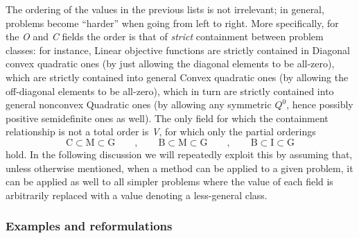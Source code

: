 The ordering of the values in the previous lists is not irrelevant; in general, problems become ``harder'' when going from left to right. More specifically, for the \textit{O} and \textit{C} fields the order is that of \emph{strict} containment between problem classes: for instance, Linear objective functions are strictly contained in Diagonal convex quadratic ones (by just allowing the diagonal elements to be all-zero), which are strictly contained into general Convex quadratic ones (by allowing the off-diagonal elements to be all-zero), which in turn are strictly contained into general nonconvex Quadratic ones (by allowing any symmetric $Q^0$, hence possibly positive semidefinite ones as well). The only field for which the containment relationship is not a total order is \textit{V}, for which only the partial orderings
\[
 \mbox{C} \subset \mbox{M} \subset \mbox{G}
 \qquad,\qquad
 \mbox{B} \subset \mbox{M} \subset \mbox{G}
 \qquad,\qquad
 \mbox{B} \subset \mbox{I} \subset \mbox{G}
\]
hold. In the following discussion we will repeatedly exploit this by assuming that, unless otherwise mentioned, when a method can be applied to a given problem, it can be applied as well to all simpler problems where the value of each field is arbitrarily replaced with a value denoting a less-general class.

\subsubsection{Examples and reformulations}\label{ssec:reform}

